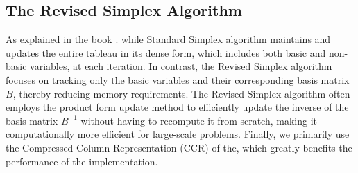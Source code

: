 \subsection{The Revised Simplex Algorithm}
As explained in the book \parencite{chvatal1983linear}.
while Standard Simplex algorithm maintains and updates the entire tableau in its dense form,
which includes both basic and non-basic variables, at each iteration.
In contrast, the Revised Simplex algorithm focuses on tracking only
the basic variables and their corresponding basis matrix $B$,
thereby reducing memory requirements.
The Revised Simplex algorithm often employs
the product form update method to efficiently
update the inverse of the basis matrix $B^{-1}$
without having to recompute it from scratch,
making it computationally more efficient for large-scale problems.
Finally, we primarily use the Compressed Column Representation (CCR) of the,
which greatly benefits the performance of the implementation.
